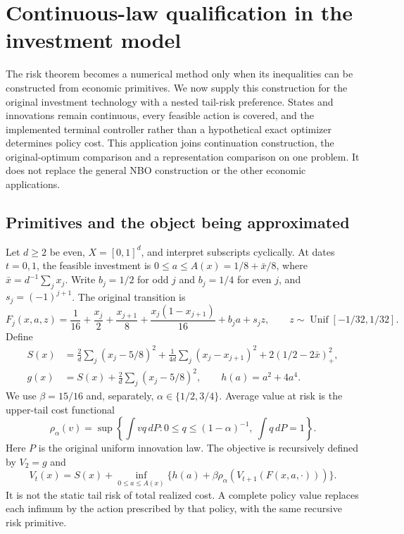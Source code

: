 \section{Continuous-law qualification in the investment model}\label{sec:continuous95}
The risk theorem becomes a numerical method only when its inequalities can be constructed from economic primitives. We now supply this construction for the original investment technology with a nested tail-risk preference. States and innovations remain continuous, every feasible action is covered, and the implemented terminal controller rather than a hypothetical exact optimizer determines policy cost. This application joins continuation construction, the original-optimum comparison and a representation comparison on one problem. It does not replace the general NBO construction or the other economic applications.

\subsection{Primitives and the object being approximated}
Let $d\geq2$ be even, $X=[0,1]^d$, and interpret subscripts cyclically. At dates $t=0,1$, the feasible investment is $0\leq a\leq A(x)=1/8+\bar x/8$, where $\bar x=d^{-1}\sum_jx_j$. Write $b_j=1/2$ for odd $j$ and $b_j=1/4$ for even $j$, and $s_j=(-1)^{j+1}$. The original transition is
\begin{equation}\label{eq:investment95}
 F_j(x,a,z)=\frac1{16}+\frac{x_j}{2}+\frac{x_{j+1}}8
       +\frac{x_j(1-x_{j+1})}{16}+b_ja+s_jz,
 \qquad z\sim\operatorname{Unif}[-1/32,1/32].
\end{equation}
Define
\begin{align}\label{eq:cost95}
 S(x)&=\frac2d\sum_j(x_j-5/8)^2+
       \frac1{4d}\sum_j(x_j-x_{j+1})^2+2(1/2-2\bar x)_+^2,\\
 g(x)&=S(x)+\frac2d\sum_j(x_j-5/8)^2,\qquad h(a)=a^2+4a^4.\nonumber
\end{align}
We use $\beta=15/16$ and, separately, $\alpha\in\{1/2,3/4\}$. Average value at risk is the upper-tail cost functional
\[
 \rho_\alpha(v)=\sup\left\{\int vq\,dP:
             0\leq q\leq(1-\alpha)^{-1},\ \int q\,dP=1\right\}.
\]
Here $P$ is the original uniform innovation law. The objective is recursively defined by $V_2=g$ and
\[
 V_t(x)=S(x)+\inf_{0\leq a\leq A(x)}
       \{h(a)+\beta\rho_\alpha(V_{t+1}(F(x,a,\cdot)))\}.
\]
It is not the static tail risk of total realized cost. A complete policy value replaces each infimum by the action prescribed by that policy, with the same recursive risk primitive.

